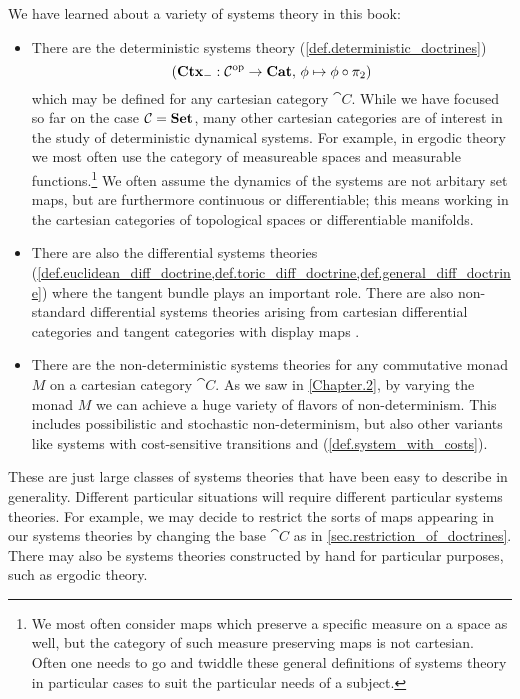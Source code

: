 \documentclass[DynamicalBook]{subfiles}
\begin{document}
We have learned about a variety of systems theory in this book:
\begin{itemize}
  \item There are the deterministic systems theory (\cref{def.deterministic_doctrines})
\[
(\textbf{Ctx}_{-}: \mathcal{C}^{\textnormal{op}} \to \textbf{Cat},\, \phi \mapsto \phi \circ \pi_2)
\]
which may be defined for any cartesian category $\cat{C}$. While we have focused
so far on the case $\mathcal{C} = \textbf{Set}$, many other cartesian categories are of
interest in the study of deterministic dynamical systems. For example, in
ergodic theory we most often use the category of measureable spaces and
measurable functions.\footnote{We most often consider maps which preserve a
  specific measure on a space as well, but the category of such measure
  preserving maps is not cartesian. Often one needs to go and twiddle these
  general definitions of systems theory in particular cases to suit the particular
  needs of a subject.} We often assume the dynamics of the systems are not arbitary
set maps, but are furthermore continuous or differentiable; this means working
in the cartesian categories of topological spaces or differentiable manifolds.
\item There are also the differential systems theories
  (\cref{def.euclidean_diff_doctrine,def.toric_diff_doctrine,def.general_diff_doctrine})
  where the tangent bundle plays an important role. There are also non-standard
  differential systems theories arising from cartesian differential categories \cite{Cruttwell:Differential.Cat} and
  tangent categories with display maps \cite{Cruttwell:Tangent.Category}.

\item There are the non-deterministic systems theories for any commutative monad $M$ on
  a cartesian category $\cat{C}$. As we saw in \cref{Chapter.2}, by varying the
  monad $M$ we can achieve a huge variety of flavors of non-determinism. This
  includes possibilistic and stochastic non-determinism, but also other variants
  like systems with cost-sensitive transitions and (\cref{def.system_with_costs}). 
\end{itemize}
These are just large classes of systems theories that have been easy to describe in
generality. Different particular situations will require different particular
systems theories. For example, we may decide to restrict the sorts of maps appearing in
our systems theories by changing the base $\cat{C}$ as in
\cref{sec.restriction_of_doctrines}. There may also be systems theories constructed by
hand for particular purposes, such as ergodic theory.
\end{document}
